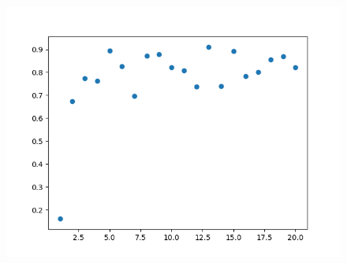 \documentclass[12pt]{scrartcl} %
\begin{document}
\begin{figure}[!h]
 \centering 
\includegraphics[scale=.3]{metricsAFDNN.png}
\end{figure}
\newline 
\end{document}
